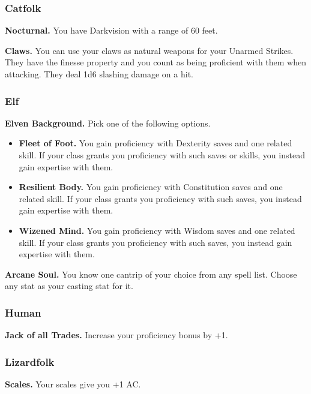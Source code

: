 \documentclass[12pt,letterpaper,twocolumn,openany,nodeprecatedcode,bg=none]{dndbook}
\providecommand{\tightlist}{%
  \setlength{\itemsep}{0pt}\setlength{\parskip}{0pt}}
\begin{document}
\subsubsection{Catfolk}\label{catfolk}

\textbf{Nocturnal.} You have Darkvision with a range of 60 feet.

\textbf{Claws.} You can use your claws as natural weapons for your
Unarmed Strikes. They have the finesse property and you count as being
proficient with them when attacking. They deal 1d6 slashing damage on a
hit.

\subsubsection{Elf}\label{elf}

\textbf{Elven Background.} Pick one of the following options.

\begin{itemize}
\tightlist
\item
  \textbf{Fleet of Foot.} You gain proficiency with Dexterity saves and
  one related skill. If your class grants you proficiency with such
  saves or skills, you instead gain expertise with them.
\item
  \textbf{Resilient Body.} You gain proficiency with Constitution saves
  and one related skill. If your class grants you proficiency with such
  saves, you instead gain expertise with them.
\item
  \textbf{Wizened Mind.} You gain proficiency with Wisdom saves and one
  related skill. If your class grants you proficiency with such saves,
  you instead gain expertise with them.
\end{itemize}

\textbf{Arcane Soul.} You know one cantrip of your choice from any spell
list. Choose any stat as your casting stat for it.

\subsubsection{Human}\label{human}

\textbf{Jack of all Trades.} Increase your proficiency bonus by +1.

\subsubsection{Lizardfolk}\label{lizardfolk}

\textbf{Scales.} Your scales give you +1 AC.
\end{document}
